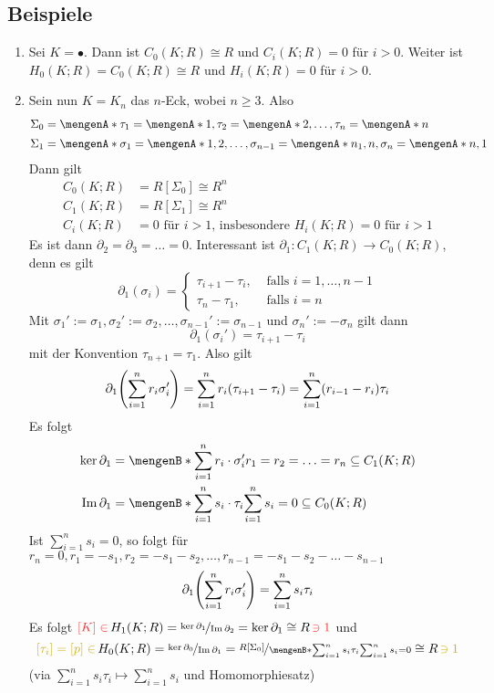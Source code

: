 \subsection[Beispiele für Homologiemoduln]{Beispiele} %
\label{sub:311}
\begin{enumerate}[(1)]
	\item Sei $K= \bullet$. Dann ist $C_0(K;R) \cong R$ und $C_i(K;R) = 0$ für $i>0$. Weiter ist $H_0(K;R) = C_0(K;R) \cong R$ und $H_i(K;R) =0$ für $i>0$.
	\item Sein nun $K=K_n$ das $n$-Eck, wobei $n \ge 3$.  Also
	\begin{align*}
		\Sigma_0 &= \set{\tau_1=\set{1}, \tau_2=\set{2}, \ldots , \tau_n = \set{n} \rule{0cm}{0.9em}} \\
 		\Sigma_1 &= \set{\sigma_1 = \set{1,2}, \ldots , \sigma_{n-1} = \set{n_1, n}, \sigma_n=\set{n,1} \rule{0cm}{0.9em}} 
	\end{align*}
	Dann gilt
	\begin{align*}
		C_0(K;R) &= R[\Sigma_0] \cong R^{n} \\
		C_1(K;R) &= R[\Sigma_1] \cong R^{n} \\
		C_i(K;R) &= 0 \text{ für $i>1$, insbesondere } H_i(K;R) = 0 \text{ für } i>1
	\end{align*}
	Es ist dann $\partial_2 = \partial_3 = \ldots  = 0$. Interessant ist $\partial_1 : C_1(K;R) \to C_0(K;R)$, denn es gilt
	\[
		\partial_1(\sigma_i) = \begin{cases}
			\tau_{i+1} - \tau_i, &\text{ falls }i=1, \ldots ,n-1\\
			\tau_n - \tau_1 , &\text{ falls } i=n
		\end{cases}
	\]
	Mit $\sigma_1' := \sigma_1, \sigma_2' := \sigma_2, \ldots , \sigma_{n-1}' := \sigma_{n-1}$ und $ \sigma_n' := - \sigma_n$ gilt dann
	\[
		\partial_1 (\sigma_i') = \tau_{i+1} - \tau_i
	\]
	mit der Konvention $\tau_{n+1} = \tau_1$. Also gilt
	\begin{align*}
		\partial_1 \enbrace*{\sum_{i=1}^{n} r_i \sigma_i' } = \sum_{i=1}^{n} r_i \enbrace*{\tau_{i+1}- \tau_i} = \sum_{i=1}^{n} (r_{i-1} - r_i) \tau_i  
	\end{align*}
	Es folgt
	\begin{align*}
		\ker \partial_1 &= \set[\sum_{i=1}^{n} r_i \cdot \sigma_i']{r_1=r_2= \ldots =r_n} \subseteq C_1(K;R) \\
		\im \partial_1 &= \set[\sum_{i=1}^{n} s_i \cdot \tau_i]{\sum_{i=1}^{n} s_i =0} \subseteq C_0(K;R)
	\end{align*}
	Ist $\sum_{i=1}^{n} s_i =0$, so folgt für $r_n=0, r_1 = -s_1, r_2=-s_1 -s_2, \ldots , r_{n-1} = -s_1 - s_2 - \ldots - s_{n-1}$
	\[
		\partial_1 \enbrace*{\sum_{i=1}^{n} r_i \sigma_i'} = \sum_{i=1}^{n} s_i \tau_i 
	\]
	Es folgt ${\color{Firebrick1}[K] \in}\, H_1(K;R) = \nicefrac{\ker \partial_1}{\im \partial_2} = \ker \partial_1 \cong R \,{\color{Firebrick1}\ni 1}$ und 
	\[
		{ \color{Gold3} [\tau_i] =[p] \in }\, H_0(K;R) = \nicefrac{\ker \partial_0}{\im \partial_1} = \nicefrac{R[\Sigma_0]}{ \set[\sum_{i=1}^{n} s_i \tau_i]{\sum_{i=1}^{n} s_i =0} } \cong R \, { \color{Gold3} \ni 1 }
	\]
	(via $\sum_{i=1}^{n} s_i \tau_i \longmapsto \sum_{i=1}^{n} s_i$ und Homomorphiesatz)
\end{enumerate}

